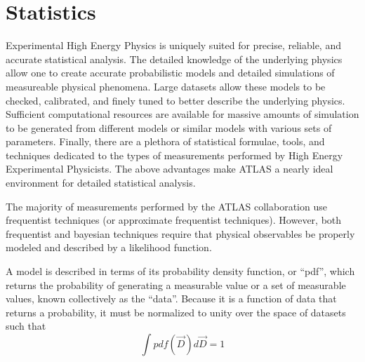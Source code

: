 

\section{Statistics}

Experimental High Energy Physics is uniquely suited for precise, reliable, and accurate statistical analysis.
The detailed knowledge of the underlying physics allow one to create accurate probabilistic models and detailed simulations of measureable physical phenomena.
Large datasets allow these models to be checked, calibrated, and finely tuned to better describe the underlying physics.
Sufficient computational resources are available for massive amounts of simulation to be generated from different models or similar models with various sets of parameters.
Finally, there are a plethora of statistical formulae, tools, and techniques dedicated to the types of measurements performed by High Energy Experimental Physicists.
The above advantages make ATLAS a nearly ideal environment for detailed statistical analysis.


The majority of measurements performed by the ATLAS collaboration use frequentist techniques (or approximate frequentist techniques).
However, both frequentist and bayesian techniques require that physical observables be properly modeled and described by a likelihood function.

A model is described in terms of its probability density function, or ``pdf'', which returns the probability of generating a measurable value or a set of measurable values, known collectively as the ``data''.
Because it is a function of data that returns a probability, it must be normalized to unity over the space of datasets such that
\begin{equation}
\int pdf(\vec{D}) d\vec{D} = 1
\end{equation}

